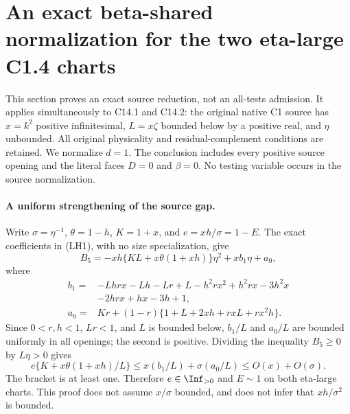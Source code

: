 \section{An exact beta-shared normalization for the two eta-large C1.4 charts}
\label{sec:r8-c1-large-eta-source-normalization}
This section proves an exact source reduction, not an all-tests admission.
It applies simultaneously to C14.1 and C14.2: the original native C1
source has $x=k^2$ positive infinitesimal, $L=x\zeta$ bounded below by a
positive real, and $\eta$ unbounded. All original physicality and
residual-complement conditions are retained. We normalize $d=1$.
The conclusion includes every positive source opening and the literal
faces $D=0$ and $\beta=0$. No testing variable occurs in the source
normalization.

\paragraph{A uniform strengthening of the source gap.}
Write $\sigma=\eta^{-1}$, $\theta=1-h$, $K=1+x$, and
$e=xh/\sigma=1-E$. The exact coefficients in (LH1), with no size
specialization, give
\[
 B_5=-xh\{KL+x\theta(1+xh)\}\eta^2+x b_1\eta+a_0,
\]
where
\begin{align*}
 b_1={}&-Lhrx-Lh-Lr+L-h^2rx^2+h^2rx-3h^2x\\
 &-2hrx+hx-3h+1,\\
 a_0={}&Kr+(1-r)\{1+L+2xh+rxL+rx^2h\}.
\end{align*}
Since $0<r,h<1$, $Lr<1$, and $L$ is bounded below,
$b_1/L$ and $a_0/L$ are bounded uniformly in all openings; the second
is positive. Dividing the inequality $B_5\ge0$ by $L\eta>0$ gives
\[
 e\{K+x\theta(1+xh)/L\}
 \le x(b_1/L)+\sigma(a_0/L)\le O(x)+O(\sigma).
 \tag{BE1}
\]
The bracket is at least one. Therefore $e\in\Inf_{>0}$ and $E\sim1$
on both eta-large charts. This proof does not assume $x/\sigma$ bounded,
and does not infer that $xh/\sigma^2$ is bounded.

